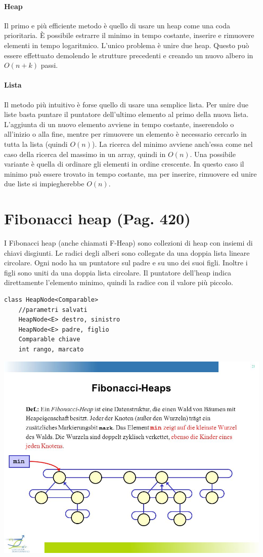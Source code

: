 \documentclass[a4paper]{book}
\newcommand{\lstIndent}{4}
\begin{document}
\paragraph*{Heap}
Il primo e più efficiente metodo è quello di usare un heap come una coda prioritaria. È possibile estrarre il minimo in tempo costante, inserire e rimuovere elementi in tempo logaritmico. L'unico problema è unire due heap. Questo può essere effettuato demolendo le strutture precedenti e creando un nuovo albero in $O(n+k)$ passi.
\paragraph*{Lista}
Il metodo più intuitivo è forse quello di usare una semplice lista. Per unire due liste basta puntare il puntatore dell'ultimo elemento al primo della nuova lista. L'aggiunta di un nuovo elemento avviene in tempo costante, inserendolo o all'inizio o alla fine, mentre per rimuovere un elemento è necessario cercarlo in tutta la lista (quindi $O(n)$). La ricerca del minimo avviene anch'essa come nel caso della ricerca del massimo in un array, quindi in $O(n)$. Una possibile variante è quella di ordinare gli elementi in ordine crescente. In questo caso il minimo può essere trovato in tempo costante, ma per inserire, rimuovere ed unire due liste si impiegherebbe $O(n)$.
\section{Fibonacci heap (Pag. 420)}
I Fibonacci heap (anche chiamati F-Heap) sono collezioni di heap con insiemi di chiavi disgiunti. Le radici degli alberi sono collegate da una doppia lista lineare circolare. Ogni nodo ha un puntatore sul padre e su uno dei suoi figli. Inoltre i figli sono uniti da una doppia lista circolare. Il puntatore dell'heap indica direttamente l'elemento minimo, quindi la radice con il valore più piccolo.
\begin{lstlisting}[tabsize=\lstIndent]
class HeapNode<Comparable>
	//parametri salvati
	HeapNode<E> destro, sinistro
	HeapNode<E> padre, figlio
	Comparable chiave
	int rango, marcato
\end{lstlisting}
\begin{center}
\includegraphics[scale=0.5]{Figures/fheap.jpg}
\end{center}
\end{document}
